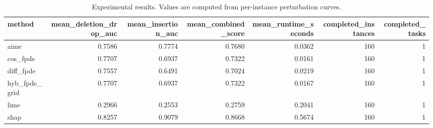 \begin{table}[t]
\caption{Experimental results. Values are computed from per-instance perturbation curves.}
\label{tab:main_results_computed}
\centering
\begin{tabular}{lrrrrrr}
\toprule
method & mean\_deletion\_drop\_auc & mean\_insertion\_auc & mean\_combined\_score & mean\_runtime\_seconds & completed\_instances & completed\_tasks \\
\midrule
aime & 0.7586 & 0.7774 & 0.7680 & 0.0362 & 160 & 1 \\
cos\_fpde & 0.7707 & 0.6937 & 0.7322 & 0.0161 & 160 & 1 \\
diff\_fpde & 0.7557 & 0.6491 & 0.7024 & 0.0219 & 160 & 1 \\
hyb\_fpde\_grid & 0.7707 & 0.6937 & 0.7322 & 0.0167 & 160 & 1 \\
lime & 0.2966 & 0.2553 & 0.2759 & 0.2041 & 160 & 1 \\
shap & 0.8257 & 0.9079 & 0.8668 & 0.5674 & 160 & 1 \\
\bottomrule
\end{tabular}

\end{table}
